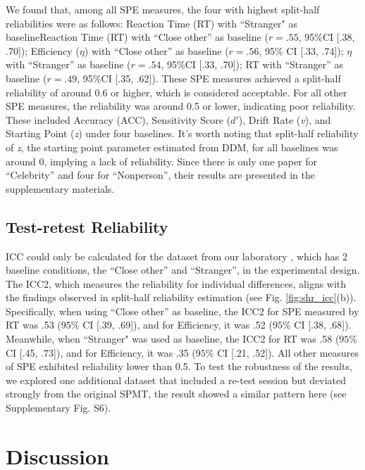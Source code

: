 \documentclass[sn-apa]{sn-jnl}%
\theoremstyle{thmstyleone}%
\theoremstyle{thmstyletwo}%
\theoremstyle{thmstylethree}%
\begin{document}
We found that, among all SPE measures, the four with highest split-half reliabilities were as follows: Reaction Time (RT) with ``Stranger" as baselineReaction Time (RT) with “Close other” as baseline ($r = .55$, 95\%CI [.38, .70]); Efficiency ($\eta$) with “Close other” as baseline ($r = .56$, 95\% CI [.33, .74]); $\eta$ with “Stranger” as baseline ($r = .54$, 95\%CI [.33, .70]); RT with “Stranger” as baseline ($r = .49$, 95\%CI [.35, .62]). These SPE measures achieved a split-half reliability of around 0.6 or higher, which is considered acceptable. For all other SPE measures, the reliability was around 0.5 or lower, indicating poor reliability. These included Accuracy (ACC), Sensitivity Score ($d'$), Drift Rate (\textit{v}), and Starting Point (\textit{z}) under four baselines. It's worth noting that split-half reliability of \textit{z}, the starting point parameter estimated from DDM, for all baselines was around 0, implying a lack of reliability. Since there is only one paper for ``Celebrity” and four for ``Nonperson”, their results are presented in the supplementary materials. 


\subsection{Test-retest Reliability}\label{subsec:testretest}

ICC could only be calculated for the dataset from our laboratory \parencite{hu2023data}, which has 2 baseline conditions, the ``Close other” and ``Stranger”, in the experimental design. The ICC2, which measures the reliability for individual differences, aligns with the findings observed in split-half reliability estimation (see Fig. \ref{fig:shr_icc}(b)). Specifically, when using ``Close other” as baseline, the ICC2 for SPE measured by RT was .53 ($95\%$ CI [.39, .69]), and for Efficiency, it was .52 ($95\%$ CI [.38, .68]). Meanwhile, when ``Stranger" was used as baseline, the ICC2 for RT was .58 ($95\%$ CI [.45, .73]), and for Efficiency, it was .35 ($95\%$ CI [.21, .52]). All other measures of SPE exhibited reliability lower than 0.5. To test the robustness of the results, we explored one additional dataset that included a re-test session but deviated strongly from the original SPMT, the result showed a similar pattern here (see Supplementary Fig. S6).
\clearpage

\section{Discussion}\label{sec5}
\end{document}
